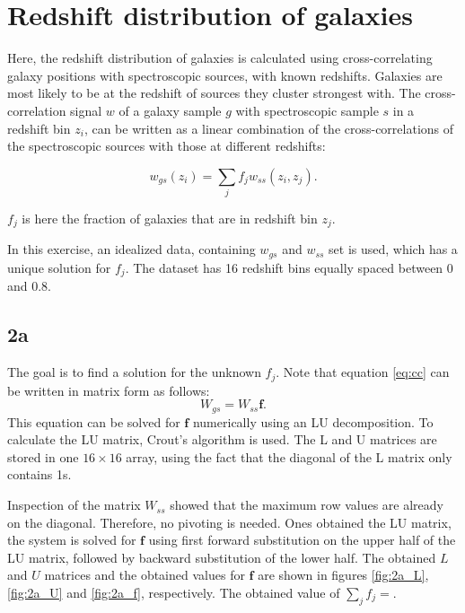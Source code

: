 \section{Redshift distribution of galaxies}
Here, the redshift distribution of galaxies is calculated using cross-correlating galaxy positions with spectroscopic sources, with known redshifts. Galaxies are most likely to be at the redshift of sources they cluster strongest with. The cross-correlation signal $w$ of a galaxy sample $g$ with spectroscopic sample $s$ in a redshift bin $z_i$, can be written as a linear combination of the cross-correlations of the spectroscopic sources with those at different redshifts:

\begin{equation}
    \label{eq:cc}
    w_{gs}(z_i) = \sum_j f_j w_{ss}(z_i, z_j).
\end{equation}

$f_j$ is here the fraction of galaxies that are in redshift bin $z_j$. 

In this exercise, an idealized data, containing $w_{gs}$ and $w_{ss}$ set is used, which has a unique solution for $f_j$. The dataset has 16 redshift bins equally spaced between 0 and 0.8. 

\subsection*{2a}
The goal is to find a solution for the unknown $f_j$. Note that equation \ref{eq:cc} can be written in matrix form as follows:
\begin{equation}
    W_{gs} = W_{ss}\mathbf{f}.
\end{equation}
This equation can be solved for $\mathbf{f}$ numerically using an LU decomposition. To calculate the LU matrix, Crout's algorithm is used. The L and U matrices are stored in one $16 \times 16$ array, using the fact that the diagonal of the L matrix only contains 1s.

Inspection of the matrix $W_{ss}$ showed that the maximum row values are already on the diagonal. Therefore, no pivoting is needed. Ones obtained the LU matrix, the system is solved for $\mathbf{f}$ using first forward substitution on the upper half of the LU matrix, followed by backward substitution of the lower half. The obtained $L$ and $U$ matrices and the obtained values for $\mathbf{f}$ are shown in figures \ref{fig:2a_L}, \ref{fig:2a_U} and \ref{fig:2a_f}, respectively. The obtained value of $\sum_j f_j = $.

